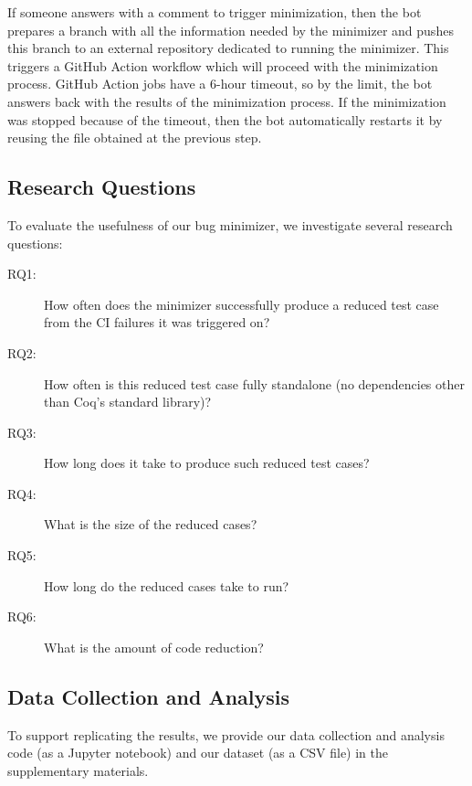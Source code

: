 \documentclass[a4paper,USenglish,cleveref,autoref,thm-restate]{lipics-v2021}
\begin{document}
If someone answers with a comment to trigger minimization, then the bot prepares a branch with all the information needed by the minimizer and pushes this branch to an external repository dedicated to running the minimizer. This triggers a GitHub Action workflow which will proceed with the minimization process. GitHub Action jobs have a 6-hour timeout, so by the limit, the bot answers back with the results of the minimization process. If the minimization was stopped because of the timeout, then the bot automatically restarts it by reusing the file obtained at the previous step.

\subsection{Research Questions}

To evaluate the usefulness of our bug minimizer, we investigate several research questions:
\begin{description}
\item[RQ1:] How often does the minimizer successfully produce a reduced test case from the CI failures it was triggered on?
\item[RQ2:] How often is this reduced test case fully standalone (no dependencies other than Coq's standard library)?
\item[RQ3:] How long does it take to produce such reduced test cases?
\item[RQ4:] What is the size of the reduced cases?
\item[RQ5:] How long do the reduced cases take to run?
\item[RQ6:] What is the amount of code reduction?
\end{description}

\subsection{Data Collection and Analysis}

To support replicating the results, we provide our data collection and analysis code (as a Jupyter notebook) and our dataset (as a CSV file) in the supplementary materials.
\end{document}

